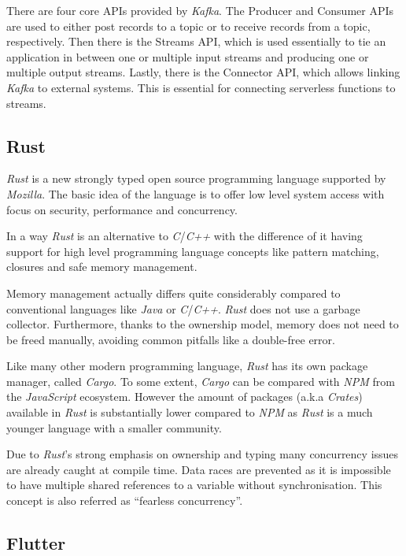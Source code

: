 There are four core APIs provided by \textit{Kafka}. The Producer and Consumer APIs are used to
either post records to a topic or to receive records from a topic, respectively. Then there is the
Streams API, which is used essentially to tie an application in between one or multiple input
streams and producing one or multiple output streams. Lastly, there is the Connector API, which
allows linking \textit{Kafka} to external systems. This is essential for connecting serverless
functions to streams.
\cite{kafka-introduction}

\subsection{Rust}

\textit{Rust} is a new strongly typed open source programming language supported by
\textit{Mozilla}. The basic idea of the language is to offer low level system access with focus on
security, performance and concurrency. \cite{rustbook1, forkjoin}

In a way \textit{Rust} is an alternative to \textit{C}/\textit{C++} with the difference of it having
support for high level programming language concepts like pattern matching, closures and safe memory
management. \cite{rustbook1, forkjoin}

Memory management actually differs quite considerably compared to conventional languages like
\textit{Java} or \textit{C}/\textit{C++}. \textit{Rust} does not use a garbage collector.
Furthermore, thanks to the ownership model, memory does not need to be freed manually, avoiding
common pitfalls like a double-free error.

Like many other modern programming language, \textit{Rust} has its own package manager, called
\textit{Cargo}. To some extent, \textit{Cargo} can be compared with \textit{NPM} from the
\textit{JavaScript} ecosystem. However the amount of packages (a.k.a \textit{Crates}) available in
\textit{Rust} is substantially lower compared to \textit{NPM} as \textit{Rust} is a much younger
language with a smaller community.

Due to \textit{Rust}'s strong emphasis on ownership and typing many concurrency issues are already
caught at compile time. Data races are prevented as it is impossible to have multiple shared
references to a variable without synchronisation. This concept is also referred as “fearless
concurrency”. \cite{rustbook2}

\subsection{Flutter}

